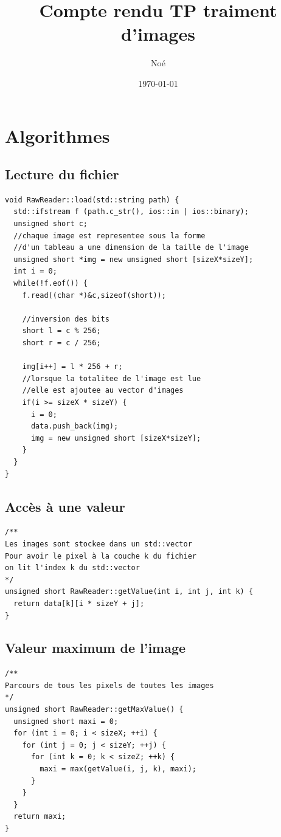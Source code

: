 \documentclass [a4 paper,11pt]{report}
\title {Compte rendu TP traiment d'images}
\author {
\bsc{LE PHILIPPE} Noé\\
}
\date{\today}
\begin{document}
\makeatletter
 
\maketitle
\section*{Algorithmes}

\subsection*{Lecture du fichier}
\begin{lstlisting}
void RawReader::load(std::string path) {
  std::ifstream f (path.c_str(), ios::in | ios::binary);
  unsigned short c;
  //chaque image est representee sous la forme
  //d'un tableau a une dimension de la taille de l'image
  unsigned short *img = new unsigned short [sizeX*sizeY];
  int i = 0;
  while(!f.eof()) {
    f.read((char *)&c,sizeof(short));

    //inversion des bits
    short l = c % 256;
    short r = c / 256;

    img[i++] = l * 256 + r;
    //lorsque la totalitee de l'image est lue
    //elle est ajoutee au vector d'images
    if(i >= sizeX * sizeY) {
      i = 0;
      data.push_back(img);
      img = new unsigned short [sizeX*sizeY];
    }
  }
}
\end{lstlisting}

\subsection*{Accès à une valeur}
\begin{lstlisting}
/**
Les images sont stockee dans un std::vector
Pour avoir le pixel à la couche k du fichier
on lit l'index k du std::vector
*/
unsigned short RawReader::getValue(int i, int j, int k) {
  return data[k][i * sizeY + j];
}
\end{lstlisting}
\newpage
\subsection*{Valeur maximum de l'image}
\begin{lstlisting}
/**
Parcours de tous les pixels de toutes les images
*/
unsigned short RawReader::getMaxValue() {
  unsigned short maxi = 0;
  for (int i = 0; i < sizeX; ++i) {
    for (int j = 0; j < sizeY; ++j) {
      for (int k = 0; k < sizeZ; ++k) {
        maxi = max(getValue(i, j, k), maxi);
      }
    }
  }
  return maxi;
}
\end{lstlisting}
\newpage
\end{document}
